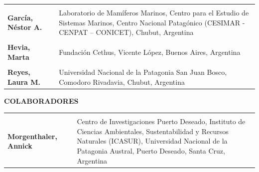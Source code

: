 \documentclass[
  x11names]{article}
\begin{document}
\begin{tabu} to 
\toprule
\textbf{} &  & \\
\textbf{García, Néstor A.} &  & Laboratorio de Mamíferos Marinos, Centro para el Estudio de Sistemas Marinos, Centro Nacional Patagónico (CESIMAR - CENPAT – CONICET), Chubut, Argentina\\
\textbf{} &  & \\
\textbf{Hevia, Marta} &  & Fundación Cethus, Vicente López, Buenos Aires, Argentina\\
\textbf{} &  & \\
\addlinespace
\textbf{Reyes, Laura M.} &  & Universidad Nacional de la Patagonia San Juan Bosco, Comodoro Rivadavia, Chubut, Argentina\\
\bottomrule
\end{tabu}

\textbf{COLABORADORES}

\begin{tabu} to 
\toprule
\textbf{} &  & \\
\textbf{Morgenthaler, Annick} &  & Centro de Investigaciones Puerto Deseado, Instituto de Ciencias Ambientales, Sustentabilidad y Recursos Naturales (ICASUR), Universidad Nacional de la Patagonia Austral, Puerto Deseado, Santa Cruz, Argentina\\
\bottomrule
\end{tabu}
\end{document}
